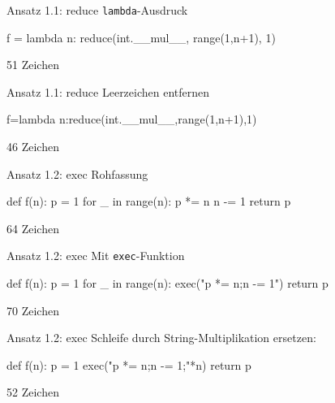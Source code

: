 \documentclass[xcolor=dvipsnames, aspectratio=169, 14pt]{beamer}
\begin{document}
\begin{frame}[fragile]{Ansatz 1.1: reduce}
	\texttt{lambda}-Ausdruck
	
	\vfill
	
	\begin{python3code}
	f = lambda n: reduce(int.__mul__, range(1,n+1), 1)
	\end{python3code}
	
	\vfill
	
	51 Zeichen
\end{frame}

\begin{frame}[fragile]{Ansatz 1.1: reduce}
	Leerzeichen entfernen
	
	\vfill
	
	\begin{python3code}
	f=lambda n:reduce(int.__mul__,range(1,n+1),1)
	\end{python3code}
	
	\vfill
	
	46 Zeichen
\end{frame}

\begin{frame}[fragile]{Ansatz 1.2: exec}
	Rohfassung
	
	\vfill
	
	\begin{python3code}
	def f(n):
	   p = 1
	   for _ in range(n):
	      p *= n
	      n -= 1
	   return p
	\end{python3code}
	
	\vfill
	
	64 Zeichen
\end{frame}

\begin{frame}[fragile]{Ansatz 1.2: exec}
	Mit \texttt{exec}-Funktion
	
	\vfill
	
	\begin{python3code}
	def f(n):
	   p = 1
	   for _ in range(n):
	      exec("p *= n;n -= 1")
	   return p
	\end{python3code}
	
	\vfill
	
	70 Zeichen
\end{frame}

\begin{frame}[fragile]{Ansatz 1.2: exec}
	Schleife durch String-Multiplikation ersetzen:
	
	\vfill
	
	\begin{python3code}
	def f(n):
	   p = 1
	   exec("p *= n;n -= 1;"*n)
	   return p
	\end{python3code}
	
	\vfill
	
	52 Zeichen
\end{frame}
\end{document}
